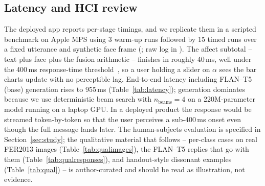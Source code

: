 \documentclass[sigconf,nonacm]{acmart}
\begin{document}
  \subsection{Latency and HCI review}
  The deployed app reports per-stage timings, and we replicate them in a scripted benchmark on Apple MPS using 3 warm-up runs followed by 15 timed runs over a fixed utterance and synthetic face frame (; raw log in ). The affect subtotal -- text plus face plus the fusion arithmetic -- finishes in roughly 40\,ms, well under the 400\,ms response-time threshold~\cite{doherty1982economic}, so a user holding a slider on $\alpha$ sees the bar charts update with no perceptible lag. End-to-end latency including FLAN--T5 (base) generation rises to 955\,ms (Table~\ref{tab:latency}); generation dominates because we use deterministic beam search with $n_\text{beams}\!=\!4$ on a 220M-parameter model running on a laptop GPU. In a deployed product the response would be streamed token-by-token so that the user perceives a sub-400\,ms onset even though the full message lands later. The human-subjects evaluation is specified in Section~\ref{sec:study}; the qualitative material that follows -- per-class cases on real FER2013 images (Table~\ref{tab:qualimages}), the FLAN--T5 replies that go with them (Table~\ref{tab:qualresponses}), and handout-style dissonant examples (Table~\ref{tab:qual}) -- is author-curated and should be read as illustration, not evidence.
\end{document}
